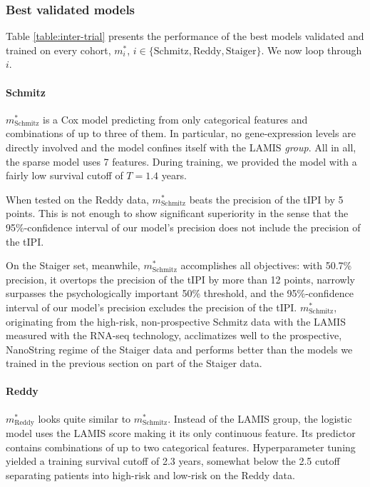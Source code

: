 \subsubsection{Best validated models}

Table \ref{table:inter-trial} presents the performance of the best models validated and trained on 
every cohort, $m_i^*$, $i \in \{ \text{Schmitz}, \text{Reddy}, \text{Staiger} \}$. We now loop 
through $i$.



\paragraph{Schmitz}
$m^*_\text{Schmitz}$ is a Cox model predicting from only categorical features and combinations of up to 
three of them. In particular, no gene-expression levels are directly involved and the model confines 
itself with the LAMIS \textit{group}. All in all, the sparse model uses \num{7} features. During 
training, we provided the model with a fairly low survival cutoff of $T = \num{1.4}$ years.

When tested on the Reddy data, $m^*_\text{Schmitz}$ beats the precision of the tIPI by 5 points. This 
is not enough to show significant superiority in the sense that the \num{95}\%-confidence interval 
of our model's precision does not include the precision of the tIPI.

On the Staiger set, meanwhile, $m^*_\text{Schmitz}$ accomplishes all objectives: with 
\num{50.7}\% precision, it overtops the precision of the tIPI by more than 12 points, narrowly 
surpasses the 
psychologically important \num{50}\% threshold, and the \num{95}\%-confidence interval of our model's 
precision excludes the precision of the tIPI. $m^*_\text{Schmitz}$, originating from 
the high-risk, non-prospective Schmitz data with the LAMIS measured with the 
RNA-seq technology, acclimatizes well to the prospective, NanoString regime of the Staiger data and 
performs better than the models we trained in the previous section on part of the Staiger data.

\paragraph{Reddy}
$m^*_\text{Reddy}$ looks quite similar to $m^*_\text{Schmitz}$. Instead of the LAMIS group, the 
logistic model uses the LAMIS score making it its only continuous feature. Its predictor contains 
combinations of up to two categorical features. Hyperparameter tuning yielded a training survival 
cutoff of \num{2.3} years, somewhat below the \num{2.5} cutoff separating patients into high-risk 
and low-risk on the Reddy data. 

